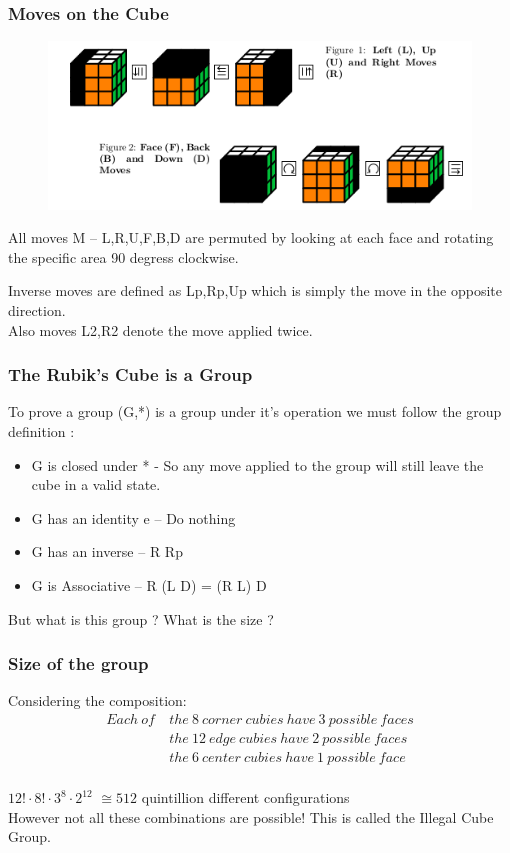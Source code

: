 \documentclass{beamer}
\begin{document}
\begin{frame}
\frametitle{Moves on the Cube}
\begin{figure}
\includegraphics[scale=.5]{rubikmoves.png}
\end{figure}
All moves M – {L,R,U,F,B,D} are permuted by looking at each face and rotating the specific area 90 degress clockwise.

Inverse moves are defined as Lp,Rp,Up which is simply the move in the opposite direction.\\

Also moves L2,R2 denote the move applied twice.
\end{frame}


\begin{frame}
\frametitle{The Rubik's Cube is a Group}
To prove a group (G,*) is a group under it's operation we must follow the group definition :
\begin{itemize}
\item G is closed under * - So any move applied to the group will still leave the cube in a valid state.
\item G has an identity e – Do nothing
\item G has an inverse – R Rp
\item G is Associative – R (L D) = (R L) D
\end{itemize}
But what is this group ? What is the size ? 
\end{frame}

\begin{frame}
\frametitle{Size of the group}
Considering the composition:
\begin{align*}
Each\ of\ &the\ 8\ corner\ cubies\ have\ 3\ possible\ faces\\
		&the\ 12\ edge\ cubies\ have\ 2\ possible\ faces\\
		&the\ 6\ center\ cubies\ have\ 1\ possible\ face\\
\end{align*}


$12!\cdot8!\cdot3^8\cdot2^{12}$ $\cong 512$ quintillion different configurations \\
However not all these combinations are possible! This is called the Illegal Cube Group. 
\end{frame}
\end{document}
